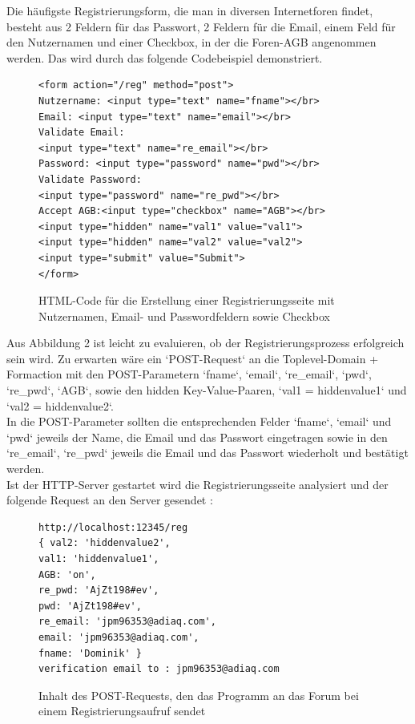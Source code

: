 Die häufigste Registrierungsform, die man in diversen Internetforen findet, besteht aus 2 Feldern für das Passwort, 2 Feldern für die Email, einem Feld für den Nutzernamen und einer Checkbox, in der die Foren-AGB angenommen werden. Das wird durch das folgende Codebeispiel demonstriert.


\begin{figure}[h!]
\begin{lstlisting}[language=HTML5]
<form action="/reg" method="post">
Nutzername: <input type="text" name="fname"></br>
Email: <input type="text" name="email"></br>
Validate Email: 
<input type="text" name="re_email"></br>
Password: <input type="password" name="pwd"></br>
Validate Password: 
<input type="password" name="re_pwd"></br>
Accept AGB:<input type="checkbox" name="AGB"></br>
<input type="hidden" name="val1" value="val1">
<input type="hidden" name="val2" value="val2">
<input type="submit" value="Submit">
</form>
\end{lstlisting}
\caption{HTML-Code für die Erstellung einer Registrierungsseite mit Nutzernamen, Email- und Passwordfeldern sowie Checkbox}
\end{figure}

Aus Abbildung 2 ist leicht zu evaluieren, ob der Registrierungsprozess erfolgreich sein wird. Zu erwarten wäre ein `POST-Request` an die Toplevel-Domain + Formaction mit den POST-Parametern `fname`, `email`, `re\_email`, `pwd`,\\ `re\_pwd`, `AGB`, sowie den hidden Key-Value-Paaren, `val1 = hiddenvalue1` und `val2 = hiddenvalue2`.\\
In die POST-Parameter sollten die entsprechenden Felder `fname`, `email` und `pwd` jeweils der Name, die Email und das Passwort eingetragen sowie in den `re\_email`, `re\_pwd` jeweils die Email und das Passwort wiederholt und bestätigt werden.\\
Ist der HTTP-Server gestartet wird die Registrierungsseite analysiert und der folgende Request an den Server gesendet :

\begin{figure}[ht]
\begin{lstlisting}[language=HTML5]
http://localhost:12345/reg
{ val2: 'hiddenvalue2',
val1: 'hiddenvalue1',
AGB: 'on',
re_pwd: 'AjZt198#ev',
pwd: 'AjZt198#ev',
re_email: 'jpm96353@adiaq.com',
email: 'jpm96353@adiaq.com',
fname: 'Dominik' }
verification email to : jpm96353@adiaq.com
\end{lstlisting}
\caption{Inhalt des POST-Requests, den das Programm an das Forum bei einem Registrierungsaufruf sendet}
\end{figure}

